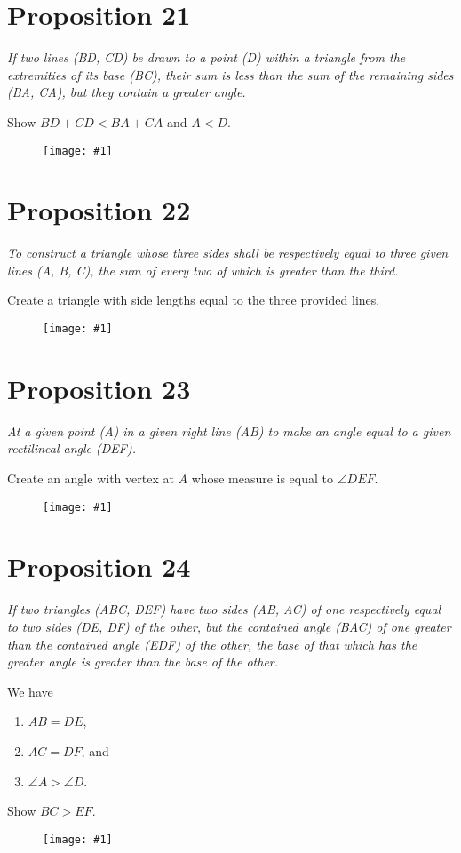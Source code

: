 \documentclass[openany]{book}
\newcommand{\diagram}[1]{
    \vspace*{\fill}
    \begin{figure}[H]
        \centering
        \texttt{[image: \#1]}
    \end{figure}
    \vspace*{\fill}
}
\newenvironment{proposition}
    {\begin{center}\em}
    {\end{center}}
\begin{document}
    \clearpage
    \section{Proposition 21}
    \begin{proposition}
    If two lines (BD, CD) be drawn to a point (D) within a triangle from the extremities of its base (BC), their sum is
    less than the sum of the remaining sides (BA, CA), but they contain a greater angle.
    \end{proposition}
    Show $BD + CD < BA + CA$ and $A < D$.
    \diagram{prop21.pdf}

    \clearpage
    \section{Proposition 22}
    \begin{proposition}
    To construct a triangle whose three sides shall be respectively equal to three given lines (A, B, C), the sum of
    every two of which is greater than the third.
    \end{proposition}
    Create a triangle with side lengths equal to the three provided lines.
    \diagram{prop22.pdf}

    \clearpage
    \section{Proposition 23}
    \begin{proposition}
    At a given point (A) in a given right line (AB) to make an angle equal to a given rectilineal angle (DEF).
    \end{proposition}
    Create an angle with vertex at $A$ whose measure is equal to $\angle{DEF}$.
    \diagram{prop23.pdf}


    \clearpage
    \section{Proposition 24}
    \begin{proposition}
    If two triangles (ABC, DEF) have two sides (AB, AC) of one respectively equal to two sides (DE, DF) of the other,
    but the contained angle (BAC) of one greater than the contained angle (EDF) of the other, the base of that which
    has the greater angle is greater than the base of the other.
    \end{proposition}
    We have
    \begin{enumerate}
        \item $AB = DE$,
        \item $AC = DF$, and
        \item $\angle{A} > \angle{D}$.
    \end{enumerate}
    Show $BC > EF$.
    \diagram{prop24.pdf}
\end{document}

